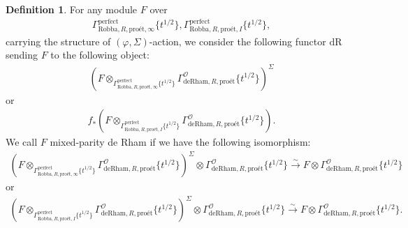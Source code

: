 \documentclass[12pt]{book}
\theoremstyle{definition}
\newtheorem{definition}{Definition}
\begin{document}
\begin{definition}
For any module $F$ over 
\begin{align}
\Gamma^\mathrm{perfect}_{\text{Robba},R,\text{pro\'et},\infty}\{t^{1/2}\},\Gamma^\mathrm{perfect}_{\text{Robba},R,\text{pro\'et},I}\{t^{1/2}\},
\end{align} 
carrying the structure of $(\varphi,\Sigma)$-action, we consider the following functor $\mathrm{dR}$ sending $F$ to the following object:
\begin{align}
(F\otimes_{\Gamma^\mathrm{perfect}_{\text{Robba},R,\text{pro\'et},\infty}\{t^{1/2}\}} \Gamma^\mathcal{O}_{\text{deRham},R,\text{pro\'et}}\{t^{1/2}\})^\Sigma
\end{align}
or 
\begin{align}
f_*(F\otimes_{\Gamma^\mathrm{perfect}_{\text{Robba},R,\text{pro\'et},I}\{t^{1/2}\}} \Gamma^\mathcal{O}_{\text{deRham},R,\text{pro\'et}}\{t^{1/2}\}).
\end{align}
We call $F$ mixed-parity de Rham if we have the following isomorphism:
\begin{align}
(F\otimes_{\Gamma^\mathrm{perfect}_{\text{Robba},R,\text{pro\'et},\infty}\{t^{1/2}\}} \Gamma^\mathcal{O}_{\text{deRham},R,\text{pro\'et}}\{t^{1/2}\})^\Sigma \otimes \Gamma^\mathcal{O}_{\text{deRham},R,\text{pro\'et}}\{t^{1/2}\} \overset{\sim}{\longrightarrow} F \otimes \Gamma^\mathcal{O}_{\text{deRham},R,\text{pro\'et}}\{t^{1/2}\} 
\end{align}
or 
\begin{align}
(F\otimes_{\Gamma^\mathrm{perfect}_{\text{Robba},R,\text{pro\'et},I}\{t^{1/2}\}} \Gamma^\mathcal{O}_{\text{deRham},R,\text{pro\'et}}\{t^{1/2}\})^\Sigma \otimes \Gamma^\mathcal{O}_{\text{deRham},R,\text{pro\'et}}\{t^{1/2}\} \overset{\sim}{\longrightarrow} F \otimes \Gamma^\mathcal{O}_{\text{deRham},R,\text{pro\'et}}\{t^{1/2}\}. 
\end{align}
\end{definition}
\end{document}
